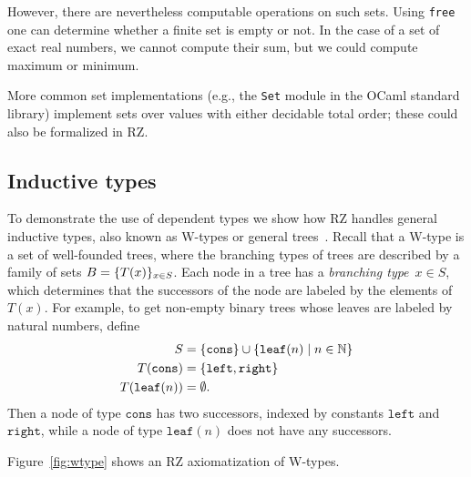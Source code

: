 However, there are nevertheless computable operations on such sets.  Using \texttt{free} one
can determine whether a finite set is empty or not.  In the case of a set of exact
real numbers, we cannot compute their sum, but we could compute maximum or minimum.

More common set implementations (e.g., the \texttt{Set} module in the OCaml standard library)
implement sets over values with either decidable total order; these could also be
formalized in RZ.

\subsection{Inductive types}
\label{sec:inductive-types}

To demonstrate the use of dependent types we show how RZ handles
general inductive types, also known as W-types or general
trees~\cite{nordstroem90:_progr_martin_type_theor}. Recall that a
W-type is a set of well-founded trees, where the branching types of
trees are described by a family of sets $B = \{T(x)\}_{x \in S}$.
Each node in a tree has a \emph{branching type}~$x \in S$, which
determines that the successors of the node are labeled by the elements
of~$T(x)$.
%
\iflong
%
For example, to get non-empty binary trees whose leaves are
labeled by natural numbers, define
%
\begin{align*}
  S &= \{\mathtt{cons}\} \cup \{\mathtt{leaf}(n) \mid n \in \mathbb{N}\}
  \\
  T(\mathtt{cons}) &= \{\mathtt{left}, \mathtt{right}\}
  \\
  T(\mathtt{leaf}(n)) &= \emptyset.
\end{align*}
%
Then a node of type $\mathtt{cons}$ has two successors, indexed by
constants $\mathtt{left}$ and $\mathtt{right}$, while a node of type
$\mathtt{leaf}(n)$ does not have any successors.
\par
%
\fi %
%
Figure~\ref{fig:wtype} shows an RZ axiomatization of W-types.
%

